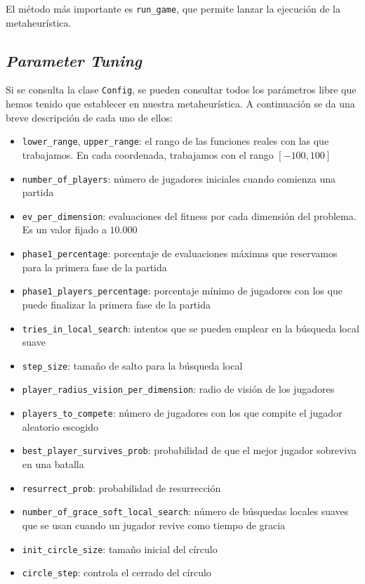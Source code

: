 \documentclass[11pt]{article}
\begin{document}
El método más importante es \lstinline{run_game}, que permite lanzar la ejecución de la metaheurística.

\subsection{\emph{Parameter Tuning}} \label{tuning}

Si se consulta la clase \lstinline{Config}, se pueden consultar todos los parámetros libre que hemos tenido que establecer en nuestra metaheurística. A continuación se da una breve descripción de cada uno de ellos:

\begin{itemize}
    \item \lstinline{lower_range}, \lstinline{upper_range}: el rango de las funciones reales con las que trabajamos. En cada coordenada, trabajamos con el rango $[-100, 100]$
    \item \lstinline{number_of_players}: número de jugadores iniciales cuando comienza una partida
    \item \lstinline{ev_per_dimension}: evaluaciones del fitness por cada dimensión del problema. Es un valor fijado a $10.000$
    \item \lstinline{phase1_percentage}: porcentaje de evaluaciones máximas que reservamos para la primera fase de la partida
    \item \lstinline{phase1_players_percentage}: porcentaje mínimo de jugadores con los que puede finalizar la primera fase de la partida
    \item \lstinline{tries_in_local_search}: intentos que se pueden emplear en la búsqueda local suave
    \item \lstinline{step_size}: tamaño de salto para la búsqueda local
    \item \lstinline{player_radius_vision_per_dimension}: radio de visión de los jugadores
    \item \lstinline{players_to_compete}: número de jugadores con los que compite el jugador aleatorio escogido
    \item \lstinline{best_player_survives_prob}: probabilidad de que el mejor jugador sobreviva en una batalla
    \item \lstinline{resurrect_prob}: probabilidad de resurrección
    \item \lstinline{number_of_grace_soft_local_search}: número de búsquedas locales suaves que se usan cuando un jugador revive como tiempo de gracia
    \item \lstinline{init_circle_size}: tamaño inicial del círculo
    \item \lstinline{circle_step}: controla el cerrado del círculo
\end{itemize}
\end{document}
